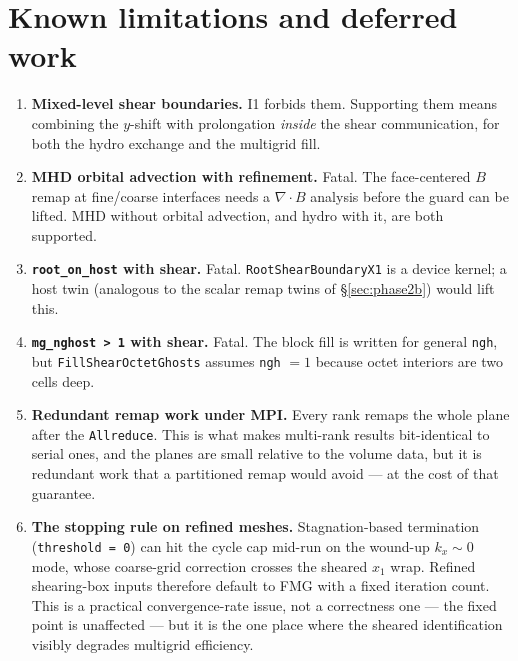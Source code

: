 \documentclass[11pt]{article}
\newcommand{\code}[1]{\texttt{#1}}
\newcommand{\fn}[1]{\texttt{\small #1}}
\begin{document}
\section{Known limitations and deferred work}
\label{sec:limits}

\begin{enumerate}\itemsep4pt
\item \textbf{Mixed-level shear boundaries.} I1 forbids them. Supporting them means
      combining the $y$-shift with prolongation \emph{inside} the shear communication,
      for both the hydro exchange and the multigrid fill.

\item \textbf{MHD orbital advection with refinement.} Fatal. The face-centered $B$
      remap at fine/coarse interfaces needs a $\nabla\!\cdot\!B$ analysis before the
      guard can be lifted. MHD without orbital advection, and hydro with it, are both
      supported.

\item \textbf{\code{root\_on\_host} with shear.} Fatal. \fn{RootShearBoundaryX1} is a
      device kernel; a host twin (analogous to the scalar remap twins of
      \S\ref{sec:phase2b}) would lift this.

\item \textbf{\code{mg\_nghost > 1} with shear.} Fatal. The block fill is written for
      general \code{ngh}, but \fn{FillShearOctetGhosts} assumes \code{ngh} $=1$
      because octet interiors are two cells deep.

\item \textbf{Redundant remap work under MPI.} Every rank remaps the whole plane after
      the \code{Allreduce}. This is what makes multi-rank results bit-identical to
      serial ones, and the planes are small relative to the volume data, but it is
      redundant work that a partitioned remap would avoid --- at the cost of that
      guarantee.

\item \textbf{The stopping rule on refined meshes.} Stagnation-based termination
      (\code{threshold = 0}) can hit the cycle cap mid-run on the wound-up $k_x \sim 0$
      mode, whose coarse-grid correction crosses the sheared $x_1$ wrap. Refined
      shearing-box inputs therefore default to FMG with a fixed iteration count. This
      is a practical convergence-rate issue, not a correctness one --- the fixed point
      is unaffected --- but it is the one place where the sheared identification
      visibly degrades multigrid efficiency.


\end{enumerate}
\end{document}
